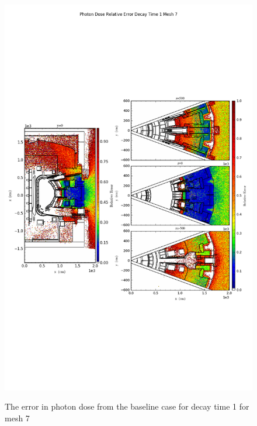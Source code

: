 \begin{figure}[ht!]
\centering
\includegraphics[trim={0cm 9cm 0cm 10cm},clip,scale=0.75]{../plots/final_model_nob4c/Photon_Dose_Relative_Error_Decay_Time_1_Mesh_7.png}
\label{fig:photons_dc1_no4bc_m7_error}
\caption{The error in photon dose from the baseline case for decay time 1 for mesh 7}
\end{figure}
